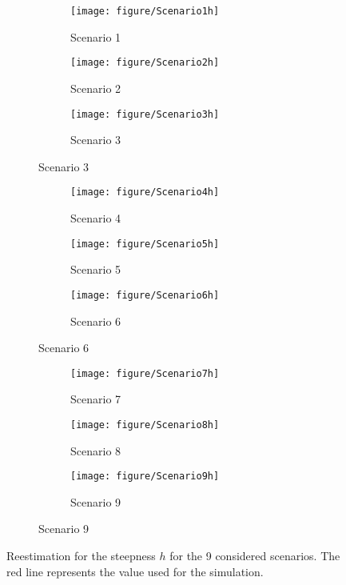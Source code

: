 \begin{figure}
  \begin{subfigure}[b]{\textwidth}
	\begin{subfigure}[b]{0.3\textwidth}
	\texttt{[image: figure/Scenario1h]}
	\caption{ Scenario 1}
	\end{subfigure}\hfill
	\begin{subfigure}[b]{0.3\textwidth}
	\texttt{[image: figure/Scenario2h]}
	\caption{ Scenario 2}
	\end{subfigure}
	\begin{subfigure}[b]{0.3\textwidth}
	\texttt{[image: figure/Scenario3h]}
	\caption{ Scenario 3}
	\end{subfigure}
  \end{subfigure}
  \begin{subfigure}[b]{\textwidth}
	\begin{subfigure}[b]{0.3\textwidth}
	\texttt{[image: figure/Scenario4h]}
	\caption{ Scenario 4}
	\end{subfigure}\hfill
	\begin{subfigure}[b]{0.3\textwidth}
	\texttt{[image: figure/Scenario5h]}
	\caption{ Scenario 5}
	\end{subfigure}
	\begin{subfigure}[b]{0.3\textwidth}
	\texttt{[image: figure/Scenario6h]}
	\caption{ Scenario 6}
	\end{subfigure}
	\end{subfigure}
  \begin{subfigure}[b]{\textwidth}
	\begin{subfigure}[b]{0.3\textwidth}
	\texttt{[image: figure/Scenario7h]}
	\caption{ Scenario 7}
	\end{subfigure}\hfill
	\begin{subfigure}[b]{0.3\textwidth}
	\texttt{[image: figure/Scenario8h]}
	\caption{ Scenario 8}
	\end{subfigure}
	\begin{subfigure}[b]{0.3\textwidth}
	\texttt{[image: figure/Scenario9h]}
	\caption{ Scenario 9}
	\end{subfigure}
  \end{subfigure}
  \caption{Reestimation for the steepness $h$ for the 9 considered scenarios. The red line represents the value used for the simulation.}
\label{fig:Scenarioh}
\end{figure} 


